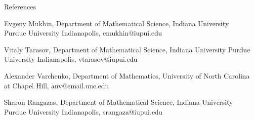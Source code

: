 \documentclass{resume} %
\begin{document}
\begin{rSection}{References}
\begin{rSubsection}{}{}
{}{}
  \item {Evgeny Mukhin, Department of Mathematical Science, Indiana University Purdue University Indianapolis, emukhin@iupui.edu}\\
  \item {Vitaly Tarasov, Department of Mathematical Science, Indiana University Purdue University Indianapolis, vtarasov@iupui.edu}\\
  \item {Alexander Varchenko, Department of Mathematics, University of North Carolina at Chapel Hill, anv@email.unc.edu}\\
  \item {Sharon Rangazas, Department of Mathematical Science, Indiana University Purdue University Indianapolis, srangaza@iupui.edu}\\
\end{rSubsection}
\end{rSection}
\end{document}

